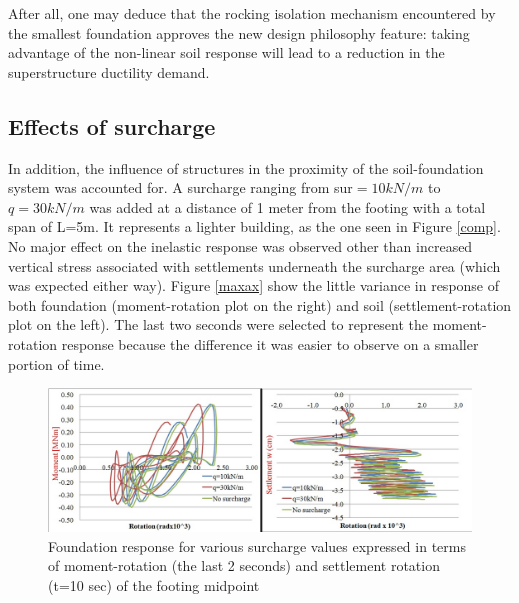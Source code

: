 

After all, one may deduce that the rocking isolation mechanism encountered by the smallest foundation approves the new design philosophy feature: taking advantage of the non-linear soil response will lead to a reduction in the superstructure ductility demand. 


\subsection{Effects of surcharge}
In addition, the influence of structures in the proximity of the soil-foundation system was accounted for. A surcharge ranging from \gls{sur}$=10kN/m$ to $q=30kN/m$ was added at a distance of 1 meter from the footing with a total span of L=5m. It represents a lighter building, as the one seen in Figure \ref{comp}. No major effect on the inelastic response was observed other than increased vertical stress associated with settlements underneath the surcharge area (which was expected either way). Figure \ref{maxax} show the little variance in response of both foundation (moment-rotation plot on the right) and soil (settlement-rotation plot on the left). The last two seconds were selected to represent the moment-rotation response because the difference it was easier to observe on a smaller portion of time.

	\begin{figure}[!h]
		\centering
		\includegraphics[width=0.9 \linewidth]{"surcharge2"}
		\caption{Foundation response for various surcharge values expressed in terms of moment-rotation (the last 2 seconds) and settlement rotation (t=10 sec) of the footing midpoint}
		\label{surch}
	\end{figure}

